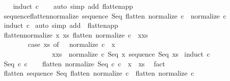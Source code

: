 \begin{isabellebody}
%
\isadelimproof
\ \ %
\endisadelimproof
%
\isatagproof
{}\isamarkupfalse%
\ {\isacharparenleft}induct\ c{\isacharparenright}\isanewline
\ \ \isamarkupfalse%
\ {\isacharparenleft}auto\ simp\ add{\isacharcolon}\ flatten{\isacharunderscore}app{\isacharparenright}\isanewline
\ \ \isamarkupfalse%
%
\endisatagproof
{\isafoldproof}%
%
\isadelimproof
\isanewline
%
\endisadelimproof
\isanewline
{}\isamarkupfalse%
\ sequence{\isacharunderscore}flatten{\isacharunderscore}normalize{\isacharcolon}\ {\isachardoublequoteopen}sequence\ Seq\ {\isacharparenleft}flatten\ {\isacharparenleft}normalize\ c{\isacharparenright}{\isacharparenright}\ {\isacharequal}\ normalize\ c{\isachardoublequoteclose}\isanewline
%
\isadelimproof
%
\endisadelimproof
%
\isatagproof
{}\isamarkupfalse%
\ {\isacharparenleft}induct\ c{\isacharparenright}\isanewline
{}\isamarkupfalse%
\ {\isacharparenleft}auto\ simp\ add{\isacharcolon}\ \ flatten{\isacharunderscore}app{\isacharparenright}\isanewline
{}\isamarkupfalse%
%
\endisatagproof
{\isafoldproof}%
%
\isadelimproof
\isanewline
%
\endisadelimproof
\isanewline
\isanewline
{}\isamarkupfalse%
\ flatten{\isacharunderscore}normalize{\isacharcolon}\ {\isachardoublequoteopen}{\isasymAnd}x\ xs{\isachardot}\ flatten\ {\isacharparenleft}normalize\ c{\isacharparenright}\ {\isacharequal}\ x{\isacharhash}xs\ \isanewline
\ \ \ \ \ \ \ {\isasymLongrightarrow}\ {\isacharparenleft}case\ xs\ of\ {\isacharbrackleft}{\isacharbrackright}\ {\isasymRightarrow}\ normalize\ c\ {\isacharequal}\ x\ \isanewline
\ \ \ \ \ \ \ \ \ \ \ \ \ \ {\isacharbar}\ {\isacharparenleft}x{\isacharprime}{\isacharhash}xs{\isacharprime}{\isacharparenright}\ {\isasymRightarrow}\ normalize\ c{\isacharequal}\ Seq\ x\ {\isacharparenleft}sequence\ Seq\ xs{\isacharparenright}{\isacharparenright}{\isachardoublequoteclose}\isanewline
%
\isadelimproof
%
\endisadelimproof
%
\isatagproof
{}\isamarkupfalse%
\ {\isacharparenleft}induct\ c{\isacharparenright}\isanewline
\ \ \isamarkupfalse%
\ {\isacharparenleft}Seq\ c{}\ c{}{\isacharparenright}\isanewline
\ \ \isamarkupfalse%
\ {\isachardoublequoteopen}flatten\ {\isacharparenleft}normalize\ {\isacharparenleft}Seq\ c{}\ c{}{\isacharparenright}{\isacharparenright}\ {\isacharequal}\ x\ {\isacharhash}\ xs{\isachardoublequoteclose}\ \isamarkupfalse%
\ fact\isanewline
\ \ \isamarkupfalse%
\ {\isachardoublequoteopen}flatten\ {\isacharparenleft}sequence\ Seq\ {\isacharparenleft}flatten\ {\isacharparenleft}normalize\ c{}{\isacharparenright}\ {\isacharat}\ flatten\ {\isacharparenleft}normalize\ c{}{\isacharparenright}{\isacharparenright}{\isacharparenright}\ {\isacharequal}\ \isanewline

\end{isabellebody}
